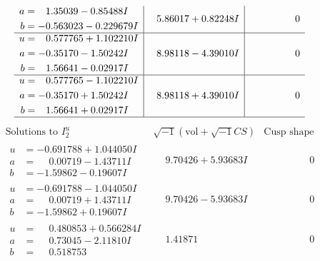 \documentclass[1p]{elsarticle_modified}
\theoremstyle{definition}
\newcommand{\I}{\sqrt{-1}}
\begin{document}
$$\begin{array}{c|c|c}
\begin{aligned}
a &= \phantom{-}1.35039 - 0.85488 I \\
b &= -0.563023 - 0.229679 I\end{aligned}
 & \phantom{-}5.86017 + 0.82248 I & \phantom{-0.000000 } 0 \\ \hline\begin{aligned}
u &= \phantom{-}0.577765 + 1.102210 I \\
a &= -0.35170 - 1.50242 I \\
b &= \phantom{-}1.56641 - 0.02917 I\end{aligned}
 & \phantom{-}8.98118 - 4.39010 I & \phantom{-0.000000 } 0 \\ \hline\begin{aligned}
u &= \phantom{-}0.577765 - 1.102210 I \\
a &= -0.35170 + 1.50242 I \\
b &= \phantom{-}1.56641 + 0.02917 I\end{aligned}
 & \phantom{-}8.98118 + 4.39010 I & \phantom{-0.000000 } 0\\
 \hline 
 \end{array}$$\newpage$$\begin{array}{c|c|c}  
\text{Solutions to }I^u_{2}& \I (\text{vol} + \sqrt{-1}CS) & \text{Cusp shape}\\
 \hline 
\begin{aligned}
u &= -0.691788 + 1.044050 I \\
a &= \phantom{-}0.00719 - 1.43711 I \\
b &= -1.59862 - 0.19607 I\end{aligned}
 & \phantom{-}9.70426 + 5.93683 I & \phantom{-0.000000 } 0 \\ \hline\begin{aligned}
u &= -0.691788 - 1.044050 I \\
a &= \phantom{-}0.00719 + 1.43711 I \\
b &= -1.59862 + 0.19607 I\end{aligned}
 & \phantom{-}9.70426 - 5.93683 I & \phantom{-0.000000 } 0 \\ \hline\begin{aligned}
u &= \phantom{-}0.480853 + 0.566284 I \\
a &= \phantom{-}0.73045 - 2.11810 I \\
b &= \phantom{-}0.518753\phantom{ +0.000000I}\end{aligned}
 & \phantom{-}1.41871\phantom{ +0.000000I} & \phantom{-0.000000 } 0 \\ \hline\begin{aligned}

\end{aligned}
\end{array}$$
\end{document}
